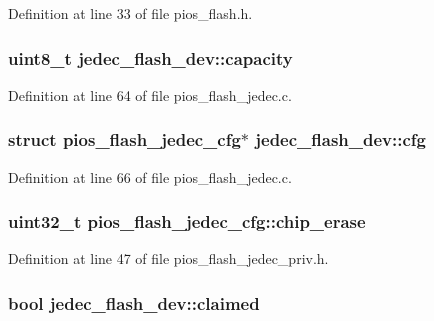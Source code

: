 \-Definition at line 33 of file pios\-\_\-flash.\-h.

\hypertarget{group___p_i_o_s___f_l_a_s_h_ga4253b6dd4128fd223d200bed60696804}{
\subsubsection[{capacity}]{\setlength{\rightskip}{0pt plus 5cm}uint8\-\_\-t {\bf jedec\-\_\-flash\-\_\-dev\-::capacity}}}\label{group___p_i_o_s___f_l_a_s_h_ga4253b6dd4128fd223d200bed60696804}


\-Definition at line 64 of file pios\-\_\-flash\-\_\-jedec.\-c.

\hypertarget{group___p_i_o_s___f_l_a_s_h_ga26db753e18e085086b539aca2438ee45}{
\subsubsection[{cfg}]{\setlength{\rightskip}{0pt plus 5cm}struct {\bf pios\-\_\-flash\-\_\-jedec\-\_\-cfg}$\ast$ {\bf jedec\-\_\-flash\-\_\-dev\-::cfg}}}\label{group___p_i_o_s___f_l_a_s_h_ga26db753e18e085086b539aca2438ee45}


\-Definition at line 66 of file pios\-\_\-flash\-\_\-jedec.\-c.

\hypertarget{group___p_i_o_s___f_l_a_s_h_ga24dfbff52821d42480cde7686f07e956}{
\subsubsection[{chip\-\_\-erase}]{\setlength{\rightskip}{0pt plus 5cm}uint32\-\_\-t {\bf pios\-\_\-flash\-\_\-jedec\-\_\-cfg\-::chip\-\_\-erase}}}\label{group___p_i_o_s___f_l_a_s_h_ga24dfbff52821d42480cde7686f07e956}


\-Definition at line 47 of file pios\-\_\-flash\-\_\-jedec\-\_\-priv.\-h.

\hypertarget{group___p_i_o_s___f_l_a_s_h_ga0252ff9aa887c054e7299923b344bf59}{
\subsubsection[{claimed}]{\setlength{\rightskip}{0pt plus 5cm}bool {\bf jedec\-\_\-flash\-\_\-dev\-::claimed}}}\label{group___p_i_o_s___f_l_a_s_h_ga0252ff9aa887c054e7299923b344bf59}


